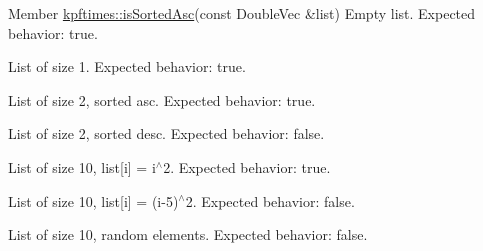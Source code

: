 \label{test__test000009}
\hypertarget{test__test000009}{}
 
\begin{DoxyDescription}
\item[Member \hyperlink{group__util_ga09e4d36be1ae592adb744e274fd619d7}{kpftimes::isSortedAsc}(const DoubleVec \&list) ]Empty list. Expected behavior: true. 

List of size 1. Expected behavior: true. 

List of size 2, sorted asc. Expected behavior: true. 

List of size 2, sorted desc. Expected behavior: false. 

List of size 10, list\mbox{[}i\mbox{]} = i$^\wedge$2. Expected behavior: true. 

List of size 10, list\mbox{[}i\mbox{]} = (i-\/5)$^\wedge$2. Expected behavior: false. 

List of size 10, random elements. Expected behavior: false. 
\end{DoxyDescription}

\label{test__test000001}
\hypertarget{test__test000001}{}
 
